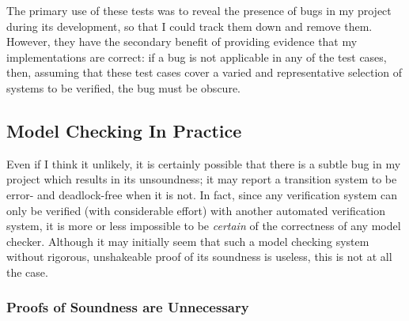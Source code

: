 \documentclass[12pt,a4paper,twoside,openright]{report}
\begin{document}
The primary use of these tests was to
reveal the presence of bugs in my
project during its development, so
that I could track them down and
remove them. However, they have the
secondary benefit of providing
evidence that my implementations are
correct: if a bug is not applicable
in any of the test cases, then,
assuming that these test cases cover a
varied and representative selection
of systems to be verified,
the bug must be obscure.

\subsection{Model Checking In Practice}
Even if I think it unlikely, it is
certainly possible that there is a subtle
bug in my project which results in its
unsoundness; it may report a transition system
to be error- and deadlock-free when it
is not. In fact, since any verification
system can only be verified (with considerable
effort) with another
automated verification system, it is
more or less impossible to be \emph{certain}
of the correctness of any model checker.
Although it may initially seem
that such a model checking system without
rigorous, unshakeable proof of its
soundness is useless, this
is not at all the case.

\subsubsection{Proofs of Soundness are Unnecessary}
\end{document}
